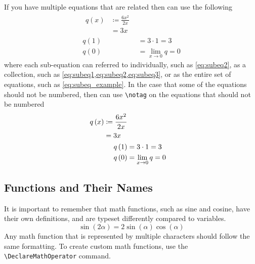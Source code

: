     If you have multiple equations that are related then can use the following
    \begin{subequations} \label{eq:subeq_example}
        \begin{align}
            \begin{split}
                q\left(x\right)&\coloneq\frac{6x^2}{2x} \\
                &=3x
            \end{split} \label{eq:subeq1} \\
            q\left(1\right)
                &=3\cdot 1=3 \label{eq:subeq2} \\
            q\left(0\right)
                &=\lim_{x\to 0} q=0 \label{eq:subeq3}
        \end{align}
    \end{subequations}
    where each sub-equation can referred to individually, such as \cref{eq:subeq2}, as a collection, such as \cref{eq:subeq1,eq:subeq2,eq:subeq3}, or as the entire set of equations, such as \cref{eq:subeq_example}.
    In the case that some of the equations should not be numbered, then can use \lstinline|\notag| on the equations that should not be numbered
    \begin{subequations}
        \begin{align}
            \begin{split}
                q\left(x\right)
                    &\coloneq\frac{6x^2}{2x} \\
                    &=3x
            \end{split} \\
            q\left(1\right)
                &=3\cdot 1=3 \notag \\
            q\left(0\right)
                &=\lim_{x\to 0} q=0
        \end{align}
    \end{subequations}

\subsection{Functions and Their Names}
    It is important to remember that math functions, such as sine and cosine, have their own definitions, and are typeset differently compared to variables.
    \begin{equation}
        \sin\left(2\alpha\right)=2\sin\left(\alpha\right)\cos\left(\alpha\right)
    \end{equation}
    Any math function that is represented by multiple characters should follow the same formatting.
    To create custom math functions, use the \lstinline|\DeclareMathOperator| command.

